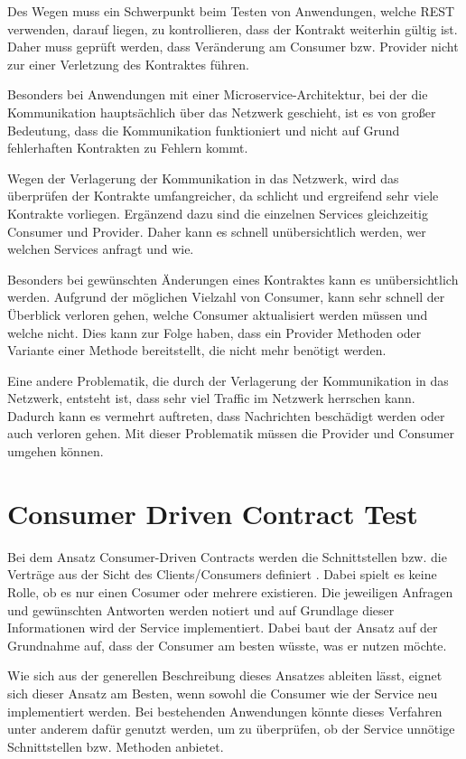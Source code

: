 \documentclass{llncs}
\begin{document}
Des Wegen muss ein Schwerpunkt beim Testen von Anwendungen, welche REST verwenden, darauf liegen, zu kontrollieren, dass der Kontrakt weiterhin gültig ist. Daher muss geprüft werden, dass Veränderung am Consumer bzw. Provider nicht zur einer Verletzung des Kontraktes führen.

Besonders bei Anwendungen mit einer Microservice-Architektur, bei der die Kommunikation hauptsächlich über das Netzwerk geschieht, ist es von großer Bedeutung, dass die Kommunikation funktioniert und nicht auf Grund fehlerhaften Kontrakten zu Fehlern kommt.

Wegen der Verlagerung der Kommunikation in das Netzwerk, wird das überprüfen der Kontrakte umfangreicher, da schlicht und ergreifend sehr viele Kontrakte vorliegen. Ergänzend dazu sind die einzelnen Services gleichzeitig Consumer und Provider. Daher kann es schnell unübersichtlich werden, wer welchen Services anfragt und wie.

Besonders bei gewünschten Änderungen eines Kontraktes kann es unübersichtlich werden. Aufgrund der möglichen Vielzahl von Consumer, kann  sehr schnell der Überblick verloren gehen, welche Consumer aktualisiert werden müssen und welche nicht. Dies kann zur Folge haben, dass ein Provider Methoden oder Variante einer Methode bereitstellt, die nicht mehr benötigt werden.

Eine andere Problematik, die durch der Verlagerung der Kommunikation in das Netzwerk, entsteht ist, dass sehr viel Traffic im Netzwerk herrschen kann. Dadurch kann es vermehrt auftreten, dass Nachrichten beschädigt werden oder auch verloren gehen. Mit dieser Problematik müssen die Provider und Consumer umgehen können.

\section{Consumer Driven Contract Test}
Bei dem Ansatz Consumer-Driven Contracts werden die Schnittstellen bzw. die Verträge aus der Sicht des Clients/Consumers definiert \cite{Robinson2006}. Dabei spielt es keine Rolle, ob es nur einen Cosumer oder mehrere existieren. Die jeweiligen Anfragen und gewünschten Antworten werden notiert und auf Grundlage dieser Informationen wird der Service implementiert. Dabei baut der Ansatz auf der Grundnahme auf, dass der Consumer am besten wüsste, was er nutzen möchte.

Wie sich aus der generellen Beschreibung dieses Ansatzes ableiten lässt, eignet sich dieser Ansatz am Besten, wenn sowohl die Consumer wie der Service neu implementiert werden. Bei bestehenden Anwendungen könnte dieses Verfahren unter anderem dafür genutzt werden, um zu überprüfen, ob der Service unnötige Schnittstellen bzw. Methoden anbietet.
\end{document}
